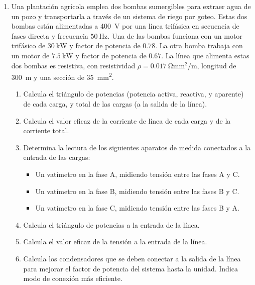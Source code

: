 \begin{enumerate}
  \emph{Sol.:\;
    $\overline{Z}={-\mathrm{j}\,129.76}\;\Omega/\mathrm{fase};\;
    I_M=\qty{2.83}{\ampere};\;
    \overline{I}_A={2.27\phase{-90^\circ}\,\si{\ampere}};\;
    \overline{I}_B={2.27\phase{30^\circ}\,\si{\ampere}};\;
    \overline{I}_C={2.27\phase{150^\circ}\,\si{\ampere}};\; 
    \\
    W_1=0;\;
    W_2=\qty{-645.24}{\watt};\; 
    W_3=\qty{645.24}{\watt}$}

\item  Una plantación agrícola emplea dos bombas sumergibles para extraer
 agua de un pozo y transportarla a través de un sistema de riego por
 goteo. Estas dos bombas están alimentadas a \SI{400}{\volt} por una
 línea trifásica en secuencia de fases directa y frecuencia
 $\SI{50}{\hertz}$. Una de las bombas funciona con un motor trifásico
 de $\SI{30}{\kilo\watt}$ y factor de potencia de $0.78$. La otra bomba
 trabaja con un motor de $\SI{7.5}{\kilo\watt}$ y factor de potencia
 de $0.67$.  La línea que alimenta estas dos bombas es resistiva, con
 resistividad $\rho = \SI{0.017}{\ohm\milli\meter\squared\per\meter}$,
 longitud de \SI{300}{m} y una sección de
 \SI{35}{\milli\meter\squared}.
 
 \begin{enumerate}
 \item Calcula el triángulo de potencias (potencia activa, reactiva, y
   aparente) de cada carga, y total de las cargas (a la salida de la
   línea).
 \item Calcula el valor eficaz de la corriente de línea de
   cada carga y de la corriente total.
 \item Determina la lectura de los siguientes aparatos de medida
   conectados a la entrada de las cargas:
   \begin{itemize}
   \item Un vatímetro en la fase A, midiendo tensión entre las fases A
     y C.
   \item Un vatímetro en la fase B, midiendo tensión entre las fases B
     y C.
   \item Un vatímetro en la fase C, midiendo tensión entre las fases B
     y A.
   \end{itemize}
 \item Calcula el triángulo de potencias a la entrada de la línea.
 \item Calcula el valor eficaz de la tensión a la entrada de la línea.
 \item Calcula los condensadores que se deben conectar a la salida de
   la línea para mejorar el factor de potencia del sistema hasta la
   unidad. Indica modo de conexión más eficiente.
 \end{enumerate}


\end{enumerate}
